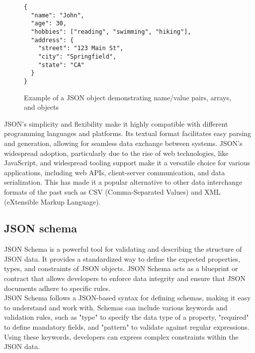 
\begin{figure}[h]
\lstset{style=json}
\begin{lstlisting}
{
  "name": "John",
  "age": 30,
  "hobbies": ["reading", "swimming", "hiking"],
  "address": {
    "street": "123 Main St",
    "city": "Springfield",
    "state": "CA"
  }
}
\end{lstlisting}
\caption[JSON object example]{Example of a JSON object demonstrating name/value pairs, arrays, and objects}
\label{JSON:Example_object}
\end{figure}

\noindent
JSON's simplicity and flexibility make it highly compatible with different programming languages and platforms. Its textual format facilitates easy parsing and generation, allowing for seamless data exchange between systems. JSON's widespread adoption, particularly due to the rise of web  technologies, like JavaScript, and widespread tooling support make it a versatile choice for various applications, including web APIs, client-server communication, and data serialization. This has made it a popular alternative to other data interchange formats of the past such as CSV (Comma-Separated Values) and XML (eXtensible Markup Language). \cite{JSON_popularity} \\

\subsection{JSON schema}

JSON Schema is a powerful tool for validating and describing the structure of JSON data. It provides a standardized way to define the expected properties, types, and constraints of JSON objects. \cite{json_schema_offical} JSON Schema acts as a blueprint or contract that allows developers to enforce data integrity and ensure that JSON documents adhere to specific rules. \\

\noindent
JSON Schema follows a JSON-based syntax for defining schemas, making it easy to understand and work with. Schemas can include various keywords and validation rules, such as "type" to specify the data type of a property, "required" to define mandatory fields, and "pattern" to validate against regular expressions. Using these keywords, developers can express complex constraints within the JSON data. \\

